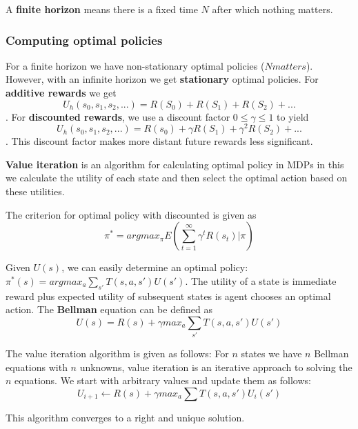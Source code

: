 \documentclass{article}
\begin{document}
A \textbf{finite horizon} means there is a fixed time $N$ after which nothing matters. 

\subsubsection{Computing optimal policies}

For a finite horizon we have non-stationary optimal policies ($N matters$). However, with an infinite horizon we get \textbf{stationary} optimal policies. For \textbf{additive rewards} we get $$U_h(s_0, s_1, s_2, ...) = R(S_0) + R(S_1) + R(S_2) + ...$$. For \textbf{discounted rewards}, we use a discount factor $0 \leq \gamma \leq 1$ to yield $$U_h(s_0,s_1,s_2,...) = R(s_0) + \gamma R(S_1) + \gamma^2 R(S_2) + ...$$. This discount factor makes more distant future rewards less significant. 

\textbf{Value iteration} is an algorithm for calculating optimal policy in MDPs in this we calculate the utility of each state and then select the optimal action based on these utilities. 

The criterion for optimal policy with discounted is given as $$\pi^* = argmax_{\pi} E (\sum_{t=1}^{\infty} \gamma^t R(s_t)|\pi)$$ 

Given $U(s)$, we can easily determine an optimal policy: $\pi^* (s) = argmax_{a} \sum_{s'} T(s,a,s')U(s')$. The utility of a state is immediate reward plus expected utility of subsequent states is agent chooses an optimal action. The \textbf{Bellman} equation can be defined as $$U(s) = R(s) + \gamma max_{a} \sum_{s'} T(s,a,s')U(s')$$

The value iteration algorithm is given as follows: For $n$ states we have $n$ Bellman equations with $n$ unknowns, value iteration is an iterative approach to solving the $n$ equations. We start with arbitrary values and update them as follows: $$U_{i+1} \leftarrow R(s) + \gamma max_a \sum T(s,a,s')U_i (s')$$

This algorithm converges to a right and unique solution. 
\end{document}
